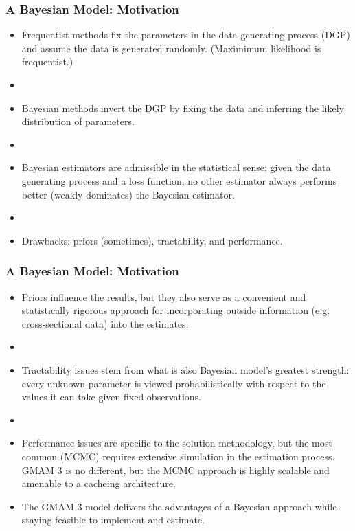 \documentclass[10pt, compress]{beamer}
\begin{document}
\begin{frame}[fragile]
\frametitle{A Bayesian Model: Motivation} \label{fr:motivation}
\begin{itemize}
    \item Frequentist methods fix the parameters in the data-generating process (DGP) and assume the data is generated randomly. (Maximimum likelihood is frequentist.)
    \item []
    \item Bayesian methods invert the DGP by fixing the data and inferring the likely distribution of parameters.
    \item []
    \item Bayesian estimators are admissible in the statistical sense: given the data generating process and a loss function, no other estimator always performs better (weakly dominates) the Bayesian estimator.
    \item []
    \item Drawbacks: priors (sometimes), tractability, and performance.
\end{itemize}
\end{frame}

\begin{frame}[fragile]
\frametitle{A Bayesian Model: Motivation} 
\begin{itemize}
    \item Priors influence the results, but they also serve as a convenient and statistically rigorous approach for incorporating outside information (e.g. cross-sectional data) into the estimates.
    \item []
    \item Tractability issues stem from what is also Bayesian model's greatest strength: every unknown parameter is viewed probabilistically with respect to the values it can take given fixed observations.
    \item []
    \item Performance issues are specific to the solution methodology, but the most common (MCMC) requires extensive simulation in the estimation process. GMAM 3 is no different, but the MCMC approach is highly scalable and amenable to a cacheing architecture.
    
    \item []
    \vspace{12pt}
    \begin{kicker}
        The GMAM 3 model delivers the advantages of a Bayesian approach while staying feasible to implement and estimate.
    \end{kicker}
\end{itemize}
\end{frame}
\end{document}
